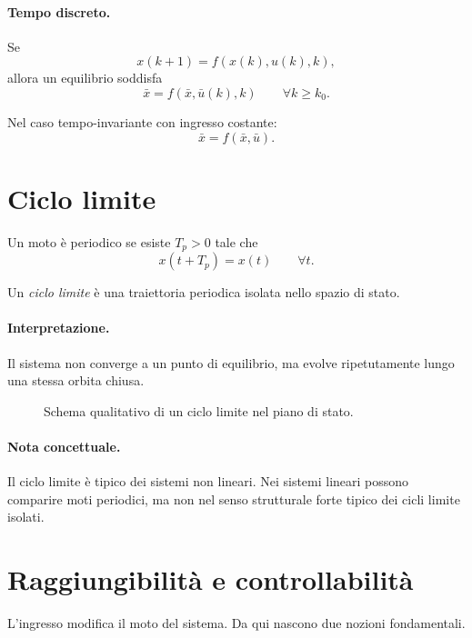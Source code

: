 \paragraph{Tempo discreto.}
Se
\[
x(k+1)=f(x(k),u(k),k),
\]
allora un equilibrio soddisfa
\[
\bar x=f(\bar x,\bar u(k),k)\qquad \forall k\ge k_0.
\]

Nel caso tempo-invariante con ingresso costante:
\[
\bar x=f(\bar x,\bar u).
\]

\section{Ciclo limite}

Un moto è periodico se esiste $T_p>0$ tale che
\[
x(t+T_p)=x(t)\qquad \forall t.
\]

Un \emph{ciclo limite} è una traiettoria periodica isolata nello spazio di stato.

\paragraph{Interpretazione.}
Il sistema non converge a un punto di equilibrio, ma evolve ripetutamente lungo una stessa orbita chiusa.

\begin{figure}[H]
\centering
{}
\caption{Schema qualitativo di un ciclo limite nel piano di stato.}
\end{figure}

\paragraph{Nota concettuale.}
Il ciclo limite è tipico dei sistemi non lineari. Nei sistemi lineari possono comparire moti periodici, ma non nel senso strutturale forte tipico dei cicli limite isolati.

\section{Raggiungibilità e controllabilità}

L'ingresso modifica il moto del sistema. Da qui nascono due nozioni fondamentali.

